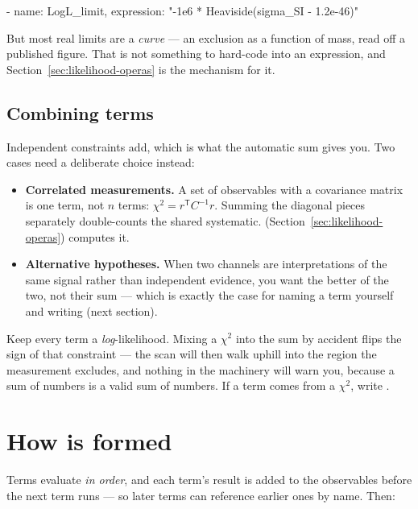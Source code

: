 \begin{yamlwin}
- {name: LogL_limit,
   expression: "-1e6 * Heaviside(sigma_SI - 1.2e-46)"}
\end{yamlwin}

But most real limits are a \emph{curve} --- an exclusion as a function of mass, read off
a published figure. That is not something to hard-code into an expression, and
Section~\ref{sec:likelihood-operas} is the mechanism for it.

\subsection*{Combining terms}

Independent constraints add, which is what the automatic sum gives you. Two cases need a
deliberate choice instead:

\begin{itemize}
  \item \textbf{Correlated measurements.} A set of observables with a covariance matrix
        is one term, not $n$ terms: $\chi^2 = r^{\mathsf{T}} C^{-1} r$. Summing the
        diagonal pieces separately double-counts the shared systematic.
         (Section~\ref{sec:likelihood-operas}) computes it.
  \item \textbf{Alternative hypotheses.} When two channels are interpretations of the
        same signal rather than independent evidence, you want the better of the two, not
        their sum --- which is exactly the case for naming a term  yourself
        and writing  (next section).
\end{itemize}

\begin{jwarn}
Keep every term a \emph{log}-likelihood. Mixing a $\chi^2$ into the sum by accident
flips the sign of that constraint --- the scan will then walk uphill into the region the
measurement excludes, and nothing in the machinery will warn you, because a sum of
numbers is a valid sum of numbers. If a term comes from a $\chi^2$, write
.
\end{jwarn}

\section{How  is formed}
\label{sec:logl-semantics}

Terms evaluate \emph{in order}, and each term's result is added to the observables before
the next term runs --- so later terms can reference earlier ones by name. Then:

